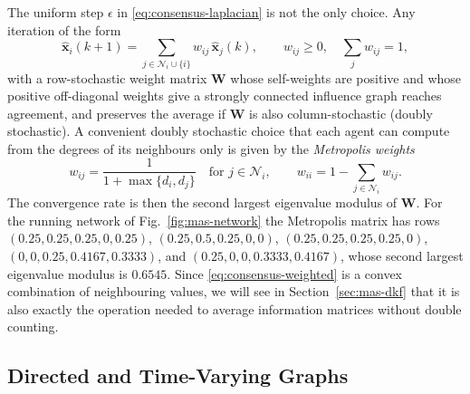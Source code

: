The uniform step $\epsilon$ in \eqref{eq:consensus-laplacian} is not the only choice. Any iteration of the form
\begin{equation}
\widehat{\mathbf{x}}_i(k+1)=\sum_{j\in\mathcal{N}_i\cup\{i\}}w_{ij}\,\widehat{\mathbf{x}}_j(k),\qquad w_{ij}\ge0,\quad \sum_{j}w_{ij}=1,
\label{eq:consensus-weighted}
\end{equation}
with a row-stochastic weight matrix $\mathbf{W}$ whose self-weights are positive and whose positive off-diagonal weights give a strongly connected influence graph reaches agreement, and preserves the average if $\mathbf{W}$ is also column-stochastic (doubly stochastic). A convenient doubly stochastic choice that each agent can compute from the degrees of its neighbours only is given by the \emph{Metropolis weights} \cite{xiao2005_distributed_fusion}
\begin{equation}
w_{ij}=\frac{1}{1+\max\{d_i,d_j\}}\quad\text{for } j\in\mathcal{N}_i,\qquad
w_{ii}=1-\sum_{j\in\mathcal{N}_i}w_{ij}.
\label{eq:metropolis-weights}
\end{equation}
The convergence rate is then the second largest eigenvalue modulus of $\mathbf{W}$. For the running network of Fig.~\ref{fig:mas-network} the Metropolis matrix has rows $(0.25,\allowbreak 0.25,\allowbreak 0.25,\allowbreak 0,\allowbreak 0.25)$, $(0.25,\allowbreak 0.5,\allowbreak 0.25,\allowbreak 0,\allowbreak 0)$, $(0.25,\allowbreak 0.25,\allowbreak 0.25,\allowbreak 0.25,\allowbreak 0)$, $(0,\allowbreak 0,\allowbreak 0.25,\allowbreak 0.4167,\allowbreak 0.3333)$, and $(0.25,\allowbreak 0,\allowbreak 0,\allowbreak 0.3333,\allowbreak 0.4167)$, whose second largest eigenvalue modulus is $0.6545$. Since \eqref{eq:consensus-weighted} is a convex combination of neighbouring values, we will see in Section~\ref{sec:mas-dkf} that it is also exactly the operation needed to average information matrices without double counting.

\subsection{Directed and Time-Varying Graphs}
\label{subsec:mas-directed}

